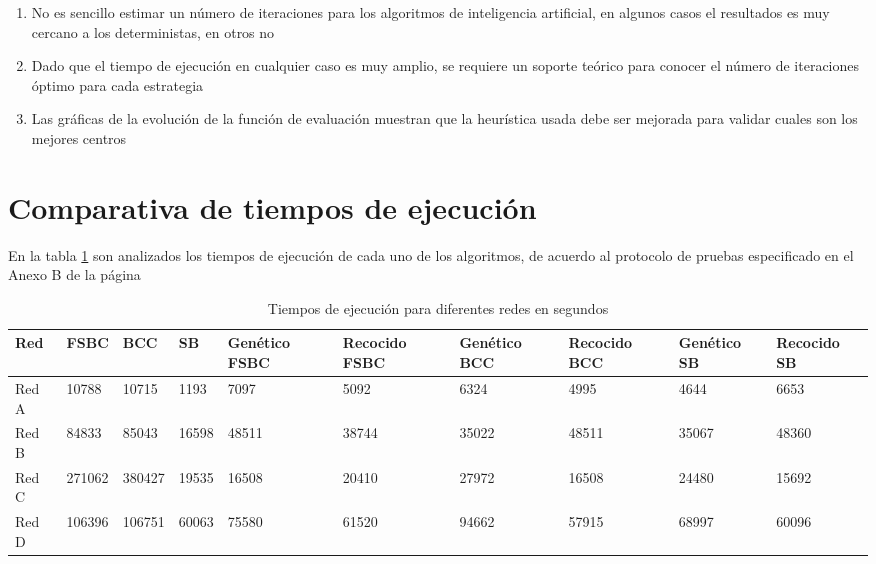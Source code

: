 \begin{enumerate}
    \item No es sencillo estimar un número de iteraciones para los algoritmos de inteligencia artificial, en algunos casos el resultados es muy cercano a los deterministas, en otros no
    \item Dado que el tiempo de ejecución en cualquier caso es muy amplio, se requiere un soporte teórico para conocer el número de iteraciones óptimo para cada estrategia
    \item Las gráficas de la evolución de la función de evaluación muestran que la heurística usada debe ser mejorada para validar cuales son los mejores centros
\end{enumerate}

\section{Comparativa de tiempos de ejecución}

En la tabla \ref{tab:executionTimes} son analizados los tiempos de ejecución de cada uno de los algoritmos, de acuerdo al protocolo de pruebas especificado en el Anexo B de la página \pageref{AnexoB}

\begin{table}[H]
    \centering
    \begin{tabular}{|p{1cm}|p{1cm}|p{1.1cm}|p{1cm}|p{1.5cm}|p{1.5cm}|p{1.5cm}|p{1.5cm}|p{1.5cm}|p{1.5cm}|}
         \hline
         \textbf{Red} & \textbf{FSBC} & \textbf{BCC} & \textbf{SB} & \textbf{Genético FSBC} & \textbf{Recocido FSBC} &
         \textbf{Genético BCC} & \textbf{Recocido BCC} &
         \textbf{Genético SB} & \textbf{Recocido SB} \\
         \hline
         Red A & 10788 & 10715 & 1193 & 7097 & 5092 & 6324 & 4995 &4644 & 6653 \\
         \hline
         Red B & 84833 & 85043  & 16598  & 48511  & 38744  &  35022 & 48511 & 35067 & 48360  \\
         \hline
         Red C & 271062 & 380427 & 19535  &  16508 & 20410  &  27972 & 16508 & 24480 & 15692  \\
         \hline
         Red D & 106396 & 106751 &  60063 & 75580  & 61520  & 94662  & 57915  & 68997 &  60096 \\
         \hline
    \end{tabular}
    \caption{Tiempos de ejecución para diferentes redes en segundos}
    \label{tab:executionTimes}
\end{table}

